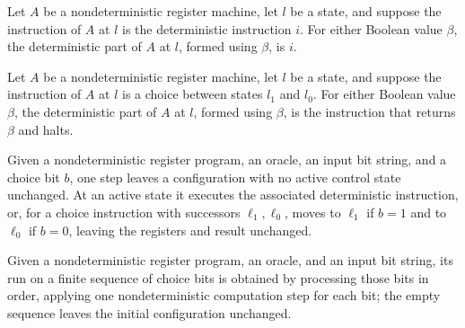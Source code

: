 \begin{lemma}
\label{Complexity.LogProg.NARM.detPart_det}
\leanok
{}
Let $A$ be a nondeterministic register machine, let $l$ be a state, and suppose the
instruction of $A$ at $l$ is the deterministic instruction $i$. For either Boolean value
$\beta$, the deterministic part of $A$ at $l$, formed using $\beta$, is $i$.
\end{lemma}

\begin{lemma}
\label{Complexity.LogProg.NARM.detPart_choose}
\leanok
{}
Let $A$ be a nondeterministic register machine, let $l$ be a state, and suppose the
instruction of $A$ at $l$ is a choice between states $l_1$ and $l_0$. For either Boolean
value $\beta$, the deterministic part of $A$ at $l$, formed using $\beta$, is the
instruction that returns $\beta$ and halts.
\end{lemma}

\begin{definition}
\label{Complexity.LogProg.nastep}
\leanok
{}
Given a nondeterministic register program, an oracle, an input bit string, and a choice
bit $b$, one step leaves a configuration with no active control state unchanged. At an
active state it executes the associated deterministic instruction, or, for a choice
instruction with successors $\ell_1,\ell_0$, moves to $\ell_1$ if $b=1$ and to $\ell_0$
if $b=0$, leaving the registers and result unchanged.
\end{definition}

\begin{definition}
\label{Complexity.LogProg.narun}
\leanok
{}
Given a nondeterministic register program, an oracle, and an input bit string, its run
on a finite sequence of choice bits is obtained by processing those bits in order,
applying one nondeterministic computation step for each bit; the empty sequence leaves
the initial configuration unchanged.
\end{definition}

